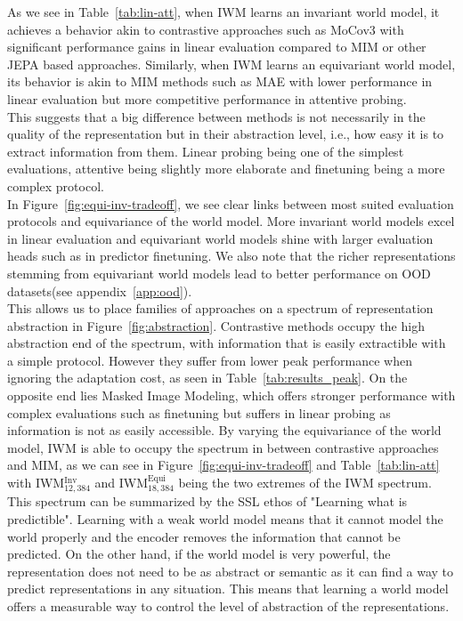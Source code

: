 \documentclass[twocolumn]{fairmeta}
\theoremstyle{plain}
\theoremstyle{definition}
\theoremstyle{remark}
\begin{document}
As we see in Table~\ref{tab:lin-att}, when IWM learns an invariant world model, it achieves a behavior akin to contrastive approaches such as MoCov3 with significant performance gains in linear evaluation compared to MIM or other JEPA based approaches. Similarly, when IWM learns an equivariant world model, its behavior is akin to MIM methods such as MAE with lower performance in linear evaluation but more competitive performance in attentive probing.\\
This suggests that a big difference between methods is not necessarily in the quality of the representation but in their abstraction level, i.e., how easy it is to extract information from them. Linear probing being one of the simplest evaluations, attentive being slightly more elaborate and finetuning being a more complex protocol.\\
In Figure~\ref{fig:equi-inv-tradeoff}, we see clear links between most suited evaluation protocols and equivariance of the world model. More invariant world models excel in linear evaluation and equivariant world models shine with larger evaluation heads such as in predictor finetuning. We also note that the richer representations stemming from equivariant world models lead to better performance on OOD datasets(see appendix~\ref{app:ood}).\\
This allows us to place families of approaches on a spectrum of representation abstraction in Figure~\ref{fig:abstraction}. Contrastive methods occupy the high abstraction end of the spectrum, with information that is easily extractible with a simple protocol. However they suffer from lower peak performance when ignoring the adaptation cost, as seen in Table~\ref{tab:results_peak}.
On the opposite end lies Masked Image Modeling, which offers stronger performance with complex evaluations such as finetuning but suffers in linear probing as information is not as easily accessible. By varying the equivariance of the world model, IWM is able to occupy the spectrum in between contrastive approaches and MIM, as we can see in Figure~\ref{fig:equi-inv-tradeoff} and Table~\ref{tab:lin-att} with IWM$^\text{Inv}_{12,384}$ and IWM$^\text{Equi}_{18,384}$ being the two extremes of the IWM spectrum.\\
This spectrum can be summarized by the SSL ethos of "Learning what is predictible". Learning with a weak world model means that it cannot model the world properly and the encoder removes the information that cannot be predicted. On the other hand, if the world model is very powerful, the representation does not need to be as abstract or semantic as it can find a way to predict representations in any situation. This means that learning a world model offers a measurable way to control the level of abstraction of the representations.
\end{document}
